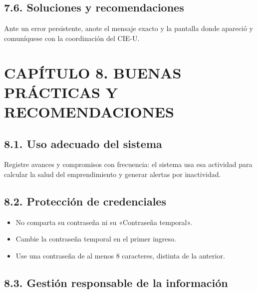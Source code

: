 \documentclass[12pt,letterpaper]{article}
\begin{document}
\subsection*{7.6. Soluciones y recomendaciones}


Ante un error persistente, anote el mensaje exacto y la pantalla donde apareció y comuníquese con la coordinación del CIE-U.

\clearpage

\section*{CAPÍTULO 8. BUENAS PRÁCTICAS Y RECOMENDACIONES}


\subsection*{8.1. Uso adecuado del sistema}


Registre avances y compromisos con frecuencia: el sistema usa esa actividad para calcular la salud del emprendimiento y generar alertas por inactividad.

\subsection*{8.2. Protección de credenciales}


\begin{itemize}
\item No comparta su contraseña ni su «Contraseña temporal».
\item Cambie la contraseña temporal en el primer ingreso.
\item Use una contraseña de al menos 8 caracteres, distinta de la anterior.
\end{itemize}

\subsection*{8.3. Gestión responsable de la información}

\end{document}
